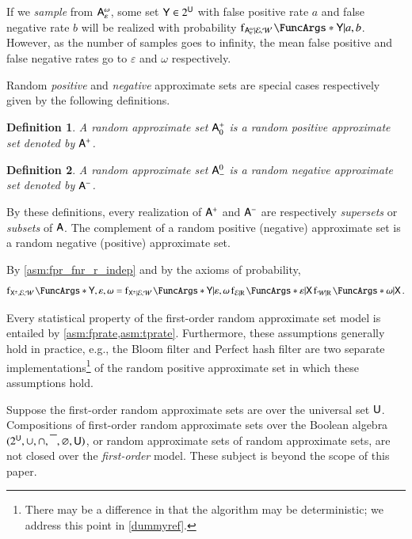 \documentclass[10pt,final,hidelinks]{article}
\numberwithin{equation}{section}
\providecommand{\Given}{\vert}
\newcommand{\EmptySet}{\varnothing}
\newcommand{\PS}[1]{2^{#1}}
\newcommand{\FNR}{\mathcal{W}}
\newcommand{\FPR}{\mathcal{E}}
\newcommand{\fprate}{\varepsilon}
\newcommand{\fnrate}{\omega}
\newcommand{\RV}[1]{\mathrm{#1}}
\newcommand{\envnumstyle}{chapter}
\renewcommand{\envnumstyle}{chapter}
\renewcommand{\envnumstyle}{section}
\theoremstyle{plain}
\newtheorem{definition}{Definition}[\envnumstyle]
\begin{document}
If we \emph{sample} from $\ASet{A}[\fprate][\fnrate]$, some set $\Set{Y} \in \PS{\Set{U}}$ with false positive rate $a$ and false negative rate $b$ will be realized with probability $\PDF{\Set{Y} \Given a, b}[\ASet{A}[\fprate][\fnrate] \Given \FPR, \FNR]$.
However, as the number of samples goes to infinity, the mean false positive and false negative rates go to $\fprate$ and $\fnrate$ respectively.

Random \emph{positive} and \emph{negative} approximate sets are special cases respectively given by the following definitions.
\begin{definition}
\label{def:pos_approx_set}
A random approximate set $\ASet{A}[0][+]$ is a random \emph{positive} approximate set denoted by $\PASet{A}$.
\end{definition}
\begin{definition}
\label{def:neg_approx_set}
A random approximate set $\ASet{A}[-][0]$ is a random \emph{negative} approximate set denoted by $\NASet{A}$.
\end{definition}
By these definitions, every realization of $\PASet{A}$ and $\NASet{A}$ are respectively \emph{supersets} or \emph{subsets} of $\Set{A}$.
The complement of a random positive (negative) approximate set is a random negative (positive) approximate set.

By \cref{asm:fpr_fnr_r_indep} and by the axioms of probability,
\begin{equation}
\PDF{\Set{Y},\fprate, \fnrate}[\ASet{X}, \FPR, \FNR] =
\PDF{\Set{Y} \Given \fprate, \fnrate}[\ASet{X} \Given \FPR, \FNR]
\PDF{\fprate \Given \Set{X}}[\FPR \Given \RV{R}] \PDF{\fnrate \Given \Set{X}}[\FNR \Given \RV{R}]\,.
\end{equation}

Every statistical property of the first-order random approximate set model is entailed by \cref{asm:fprate,asm:tprate}.
Furthermore, these assumptions generally hold in practice, e.g., the Bloom filter\cite{bf} and Perfect hash filter\cite{phf} are two separate implementations\footnote{There may be a difference in that the algorithm may be deterministic; we address this point in \cref{dummyref}.} of the random positive approximate set in which these assumptions hold.

Suppose the first-order random approximate sets are over the universal set $\Set{U}$.
Compositions of first-order random approximate sets over the Boolean algebra $(\PS{\Set{U}},\SetUnion,\SetIntersection,\SetComplement,\EmptySet,\Set{U})$, or random approximate sets of random approximate sets, are not closed over the \emph{first-order} model.
These subject is beyond the scope of this paper.
\end{document}
